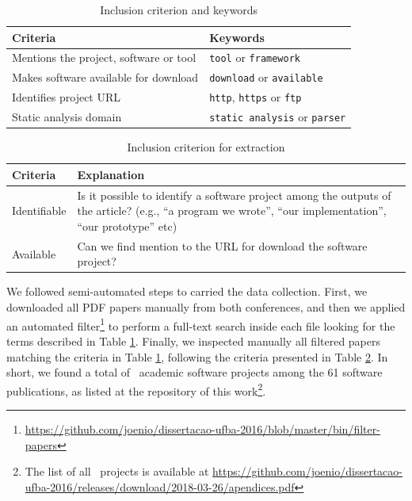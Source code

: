 \begin{table}[ht]
\caption{Inclusion criterion and keywords}
\centering
\begin{tabular}{ p{4cm} l }
  \hline
  {\bf Criteria}                           & {\bf Keywords}                        \\
  \hline
  Mentions the project, software or tool   & {\tt tool} or {\tt framework}         \\
  Makes software available for download    & {\tt download} or {\tt available}     \\
  Identifies project URL                   & {\tt http}, {\tt https} or {\tt ftp}  \\
  Static analysis domain                   & {\tt static analysis} or {\tt parser} \\
  \hline
\end{tabular}
\label{screening-criterias}
\end{table}


\begin{table}[ht]
\caption{Inclusion criterion for extraction \cite{howison2016software}}
\centering
\begin{tabular}{ l p{6cm} }
  \hline
  {\bf Criteria}   & {\bf Explanation} \\
  \hline
  Identifiable     & Is it possible to identify a software project among the outputs of the article? (e.g., ``a program we wrote'', ``our implementation'', ``our prototype'' etc) \\
  Available        & Can we find mention to the URL for download the software project? \\
  \hline
\end{tabular}
\label{extraction-criterias}
\end{table}

We followed semi-automated steps to carried the data collection. First, we
downloaded all PDF papers manually from both conferences, and then we applied
an automated filter\footnote{\url{https://github.com/joenio/dissertacao-ufba-2016/blob/master/bin/filter-papers}}
to perform a full-text search inside each file looking for the terms described
in Table \ref{screening-criterias}.
%
Finally, we inspected manually all filtered papers matching the criteria in
Table \ref{screening-criterias}, following the criteria presented in Table
\ref{extraction-criterias}. In short, we found a total of \SoftwareCount \
academic software projects among the 61 software publications, as listed at the
repository of this work\footnote{The list of all \SoftwareCount \ projects is available at \url{https://github.com/joenio/dissertacao-ufba-2016/releases/download/2018-03-26/apendices.pdf}}.


